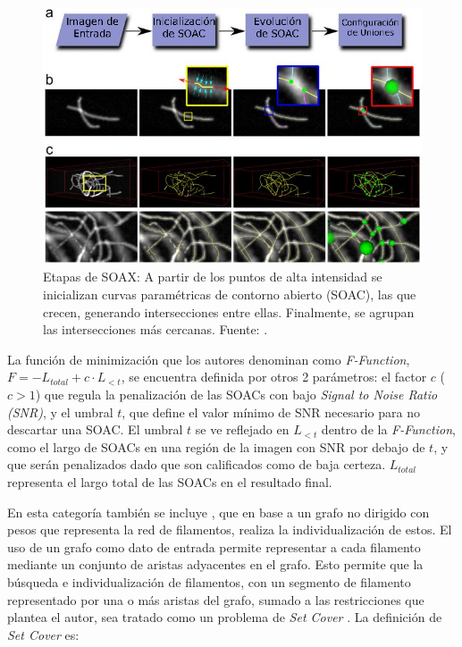 \begin{figure}[h]
        \includegraphics[scale=0.7]{imagenes/SOAX_translated.png}
        \caption[Etapas de SOAX.]{Etapas de SOAX: A partir de los puntos de alta intensidad se inicializan curvas param\'etricas de contorno abierto (SOAC), las que crecen, generando intersecciones entre ellas. Finalmente, se agrupan las intersecciones más cercanas. Fuente: \citet{xu2015soax}.}
        \label{fig:SOAX}
\end{figure}

La funci\'on de minimizaci\'on que los autores denominan como  \textit{F-Function}, $F = -L_{total} + {c}\cdot L_{<t}$, se encuentra definida por otros 2 par\'ametros: el factor $c$ ($c > 1$) que regula la penalizaci\'on de las SOACs con bajo \textit{Signal to Noise Ratio (SNR)}, y el umbral $t$, que define el valor mínimo de SNR necesario para no descartar una SOAC. El umbral $t$ se ve reflejado en $L_{<t}$ dentro de la \textit{F-Function}, como el largo de SOACs en una regi\'on de la imagen con SNR por debajo de $t$, y que ser\'an penalizados dado que son calificados como de baja certeza. $L_{total}$ representa el largo total de las SOACs en el resultado final.



En esta categor\'ia tambi\'en se incluye \citet{breuer2015define}, que en base a un grafo no dirigido con pesos que representa la red de filamentos, realiza la individualizaci\'on de estos. El uso de un grafo como dato de entrada permite representar a cada filamento mediante un conjunto de aristas adyacentes en el grafo. Esto permite que la b\'usqueda e individualizaci\'on de filamentos, con un segmento de filamento representado por una o m\'as aristas del grafo, sumado a las restricciones que plantea el autor, sea tratado como un problema de {\it Set Cover} \citep{caprara2000algorithms}. La definici\'on de {\it Set Cover} es:

